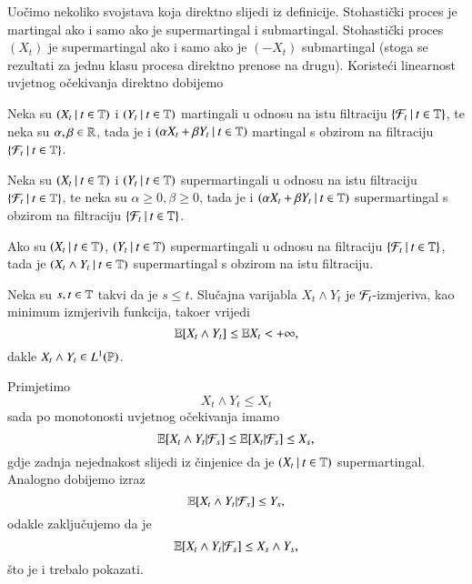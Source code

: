 Uo\v cimo nekoliko svojstava koja direktno slijedi iz definicije.
Stohasti\v cki proces je martingal ako i samo ako je supermartingal i submartingal.
Stohasti\v cki proces $(X_t)$ je supermartingal ako i samo ako je $(-X_t)$ submartingal (stoga se rezultati za jednu klasu procesa direktno prenose na drugu).
Koriste\' ci linearnost uvjetnog o\v cekivanja direktno dobijemo

\begin{prop}    \label{prop:23.5}
    Neka su $({X_t} \: | \: {t \in \mathbb{T}})$ i $({Y_t} \: | \: {t \in \mathbb{T}})$ martingali u odnosu na istu filtraciju $\{{\mathcal{F}_t} \: | \: {t \in \mathbb{T}}\}$, te neka su $\alpha, \beta \in \mathbb{R}$, tada je i $({\alpha X_t + \beta Y_t} \: | \: {t \in \mathbb{T}})$ martingal s obzirom na filtraciju $\{{\mathcal{F}_t} \: | \: {t \in \mathbb{T}}\}$.
\end{prop}

\begin{prop}    \label{prop:23.6}
    Neka su $({X_t} \: | \: {t \in \mathbb{T}})$ i $({Y_t} \: | \: {t \in \mathbb{T}})$ supermartingali u odnosu na istu filtraciju $\{{\mathcal{F}_t} \: | \: {t \in \mathbb{T}}\}$, te neka su $\alpha \geq 0, \beta \geq 0$, tada je i $({\alpha X_t + \beta Y_t} \: | \: {t \in \mathbb{T}})$ supermartingal s obzirom na filtraciju $\{{\mathcal{F}_t} \: | \: {t \in \mathbb{T}}\}$.
\end{prop}

\begin{zad} \label{zad:23.7}
    Ako su $({X_t} \: | \: {t \in \mathbb{T}})$, $({Y_t} \: | \: {t \in \mathbb{T}})$ supermartingali u odnosu na filtraciju $\{{\mathcal{F}_t} \: | \: {t \in \mathbb{T}}\}$, tada je $({X_t \land Y_t} \: | \: {t \in \mathbb{T}})$ supermartingal s obzirom na istu filtraciju.
\end{zad}

\begin{rj}[\ref{zad:23.7}]
    Neka su $s, t \in \mathbb{T}$ takvi da je $s \leq t$.
    Slu\v cajna varijabla $X_t \land Y_t$ je $\mathcal{F}_t$-izmjeriva, kao minimum izmjerivih funkcija, tako\dj er vrijedi
    \begin{equation*}
        \mathbb{E} [X_t \land Y_t] \leq \mathbb{E} X_t < +\infty,
    \end{equation*}
    dakle $X_t \land Y_t \in L^1 (\mathbb{P})$.

    Primjetimo
    \begin{equation*}
        X_t \land Y_t \leq X_t
    \end{equation*}
    sada po monotonosti uvjetnog o\v cekivanja imamo
    \begin{equation*}
        \mathbb{E} [X_t \land Y_t | \mathcal{F}_s] \leq \mathbb{E} [X_t | \mathcal{F}_s] \leq X_s,
    \end{equation*}
    gdje zadnja nejednakost slijedi iz \v cinjenice da je $({X_t} \: | \: {t \in \mathbb{T}})$ supermartingal.
    Analogno dobijemo izraz
    \begin{equation*}
        \mathbb{E} [X_t \land Y_t | \mathcal{F}_s] \leq Y_s,
    \end{equation*}
    odakle zaklju\v cujemo da je
    \begin{equation*}
        \mathbb{E} [X_t \land Y_t | \mathcal{F}_s] \leq X_s \land Y_s,
    \end{equation*}
    \v sto je i trebalo pokazati.
\end{rj}

